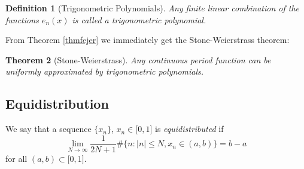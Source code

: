 \documentclass[12pt,letterpaper]{report}
\newcommand\be{\begin{equation}}
\newcommand\ee{\end{equation}}
\newtheorem{thm}{Theorem}[section]
\newtheorem{defi}[thm]{Definition}
\begin{document}
\begin{defi}[Trigonometric Polynomials] Any finite linear
combination of the functions $e_n(x)$ is called a trigonometric
polynomial. \end{defi}

From Theorem \ref{thmfejer} we immediately get the
Stone-Weierstrass theorem:

\begin{thm}[Stone-Weierstrass] Any continuous period function can be uniformly
approximated by trigonometric polynomials. \end{thm}

\subsection{Equidistribution}
We say that a sequence $\{x_n\}$, $x_n \in \lbrack 0,1\rbrack$ is
{\em equidistributed} if \be \lim_{N\to \infty} \frac{1}{2 N +1}
\# \{n : |n|\leq N, x_n\in (a,b)\} = b-a\ee  for all $(a,b)\subset
\lbrack 0,1\rbrack$.
\end{document}
